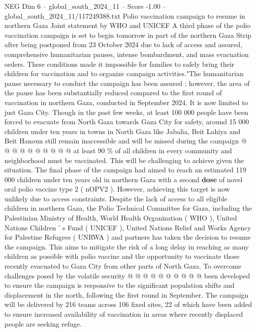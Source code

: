 \begin{textsample}{NEG Dim 6 – global\_south\_2024\_11 – Score -1.00 – global\_south\_2024\_11/117249388.txt}  \label{ex:f6_neg_112}
Polio vaccination campaign to resume in northern Gaza Joint statement by WHO and UNICEF A third phase of the polio vaccination campaign is set to begin tomorrow in part of the northern Gaza Strip after being postponed from 23 October 2024 due to lack of access and assured, comprehensive humanitarian pauses, intense bombardment, and mass evacuation orders.
These conditions made it impossible for families to safely bring their children for vaccination and to organize campaign activities."The humanitarian pause necessary to conduct the campaign has been assured ; however, the area of the pause has been substantially reduced compared to the first round of vaccination in northern Gaza, conducted in September 2024.
It is now limited to just Gaza City.
Though in the past few weeks, at least 100 000 people have been forced to evacuate from North Gaza towards Gaza City for safety, around 15 000 children under ten years in towns in North Gaza like Jabalia, Beit Lahiya and Beit Hanoun still remain inaccessible and will be missed during the campaign @ @ @ @ @ @ @ @ @ @ at least 90 \% of all children in every community and neighborhood must be vaccinated.
This will be challenging to achieve given the situation.
The final phase of the campaign had aimed to reach an estimated 119 000 children under ten years old in northern Gaza with a second \textbf{dose} of novel oral polio vaccine type 2 ( nOPV2 ).
However, achieving this target is now unlikely due to access constraints.
Despite the lack of access to all eligible children in northern Gaza, the Polio Technical Committee for Gaza, including the Palestinian Ministry of Health, World Health Organization ( WHO ), United Nations Children ' s Fund ( UNICEF ), United Nations Relief and Works Agency for Palestine Refugees ( UNRWA ) and partners has taken the decision to resume the campaign.
This aims to mitigate the risk of a long delay in reaching as many children as possible with polio vaccine and the opportunity to vaccinate those recently evacuated to Gaza City from other parts of North Gaza.
To overcome challenges posed by the volatile security @ @ @ @ @ @ @ @ @ @ been developed to ensure the campaign is responsive to the significant population shifts and displacement in the north, following the first round in September.
The campaign will be delivered by 216 teams across 106 fixed sites, 22 of which have been added to ensure increased availability of vaccination in areas where recently displaced people are seeking refuge.

\end{textsample}
